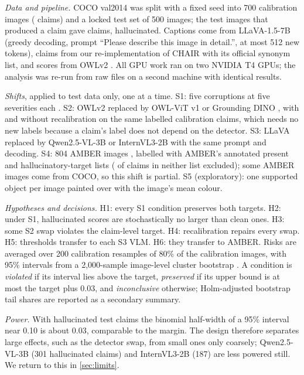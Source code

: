 \documentclass[journal]{IEEEtran}
\theoremstyle{remark}\newtheorem{remark}{Remark}
\begin{document}
\emph{Data and pipeline.} COCO val2014 \cite{lin2014microsoft} was split with a fixed seed into 700 calibration images (\NCal{} claims) and a locked test set of 500 images; the \NTestImg{} test images that produced a claim gave \NTest{} claims, \NTestHall{} hallucinated. Captions come from LLaVA-1.5-7B \cite{liu2024improved} (greedy decoding, prompt ``Please describe this image in detail.'', at most 512 new tokens), claims from our re-implementation of CHAIR with its official synonym list, and scores from OWLv2 \cite{minderer2023scaling}. All GPU work ran on two NVIDIA T4 GPUs; the analysis was re-run from raw files on a second machine with identical results.

\emph{Shifts}, applied to test data only, one at a time. S1: five corruptions at five severities each \cite{hendrycks2019benchmarking}. S2: OWLv2 replaced by OWL-ViT v1 \cite{minderer2022simple} or Grounding DINO \cite{liu2024grounding}, with and without recalibration on the same labelled calibration claims, which needs no new labels because a claim's label does not depend on the detector. S3: LLaVA replaced by Qwen2.5-VL-3B \cite{bai2025qwen25} or InternVL3-2B \cite{zhu2025internvl3} with the same prompt and decoding. S4: 804 AMBER images \cite{wang2023amber}, labelled with AMBER's annotated present and hallucinatory-target lists (\NAmberUnknown{} of \NAmberClaims{} claims in neither list excluded); some AMBER images come from COCO, so this shift is partial. S5 (exploratory): one supported object per image painted over with the image's mean colour.

\emph{Hypotheses and decisions.} H1: every S1 condition preserves both targets. H2: under S1, hallucinated scores are stochastically no larger than clean ones. H3: some S2 swap violates the claim-level target. H4: recalibration repairs every swap. H5: thresholds transfer to each S3 VLM. H6: they transfer to AMBER. Risks are averaged over 200 calibration resamples of 80\% of the calibration images, with 95\% intervals from a 2,000-sample image-level cluster bootstrap \cite{efron1993introduction}. A condition is \emph{violated} if its interval lies above the target, \emph{preserved} if its upper bound is at most the target plus 0.03, and \emph{inconclusive} otherwise; Holm-adjusted bootstrap tail shares \cite{holm1979simple} are reported as a secondary summary.

\emph{Power.} With \NTestHall{} hallucinated test claims the binomial half-width of a 95\% interval near 0.10 is about 0.03, comparable to the margin. The design therefore separates large effects, such as the detector swap, from small ones only coarsely; Qwen2.5-VL-3B (301 hallucinated claims) and InternVL3-2B (187) are less powered still. We return to this in \cref{sec:limits}.
\end{document}
